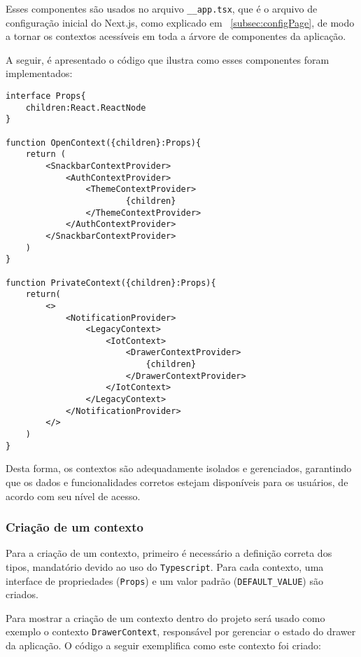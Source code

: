 Esses componentes são usados no arquivo \texttt{\_\_app.tsx}, que é o arquivo de configuração inicial do Next.js, como explicado em ~\ref{subsec:configPage}, de modo a tornar os contextos acessíveis em toda a árvore de componentes da aplicação.

A seguir, é apresentado o código que ilustra como esses componentes foram implementados:

\begin{verbatim}
interface Props{
    children:React.ReactNode
}

function OpenContext({children}:Props){
    return (
        <SnackbarContextProvider>
            <AuthContextProvider>
                <ThemeContextProvider>
                        {children}
                </ThemeContextProvider>
            </AuthContextProvider>
        </SnackbarContextProvider>
    )
}

function PrivateContext({children}:Props){
    return(
        <>
            <NotificationProvider>
                <LegacyContext>
                    <IotContext>
                        <DrawerContextProvider>
                            {children}
                        </DrawerContextProvider>
                    </IotContext>
                </LegacyContext>
            </NotificationProvider>
        </> 
    )
}
\end{verbatim}

Desta forma, os contextos são adequadamente isolados e gerenciados, garantindo que os dados e funcionalidades corretos estejam disponíveis para os usuários, de acordo com seu nível de acesso.


\subsubsection{Criação de um contexto}\label{subsubsec:contextCreation}
Para a criação de um contexto, primeiro é necessário a definição correta dos tipos, mandatório devido ao uso do \texttt{Typescript}. Para cada contexto, uma interface de propriedades (\texttt{Props}) e um valor padrão (\texttt{DEFAULT\_VALUE}) são criados. 

Para mostrar a criação de um contexto dentro do projeto será usado como exemplo  o contexto \texttt{DrawerContext}, responsável por gerenciar o estado do drawer da aplicação. O código a seguir exemplifica como este contexto foi criado:

